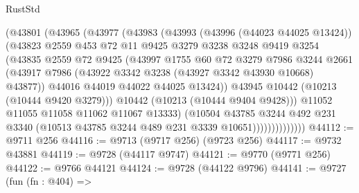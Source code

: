 \begin{lexlean}{RustStd}
\begin{coremodule}
                      (@43801
                        (@43965
                          (@43977
                            (@43983
                              (@43993
                                (@43996 (@44023 @44025 @13424))
                                (@43823
                                  @2559
                                  @453
                                  @72
                                  @11
                                  @9425
                                  @3279
                                  @3238
                                  @3248
                                  @9419
                                  @3254
                                  (@43835
                                    @2559
                                    @72
                                    @9425
                                    (@43997
                                      @1755
                                      @60
                                      @72
                                      @3279
                                      @7986
                                      @3244
                                      @2661
                                      (@43917
                                        @7986
                                        (@43922 @3342 @3238 (@43927 @3342 @43930 @10668) @43877))
                                      @44016
                                      @44019
                                      @44022
                                      @44025
                                      @13424))
                                  @43945
                                  @10442
                                  (@10213 (@10444 @9420 @3279)))
                                @10442
                                (@10213 (@10444 @9404 @9428)))
                              @11052
                              @11055
                              @11058
                              @11062
                              @11067
                              @13333)
                            (@10504
                              @43785
                              @3244
                              @492
                              @231
                              @3340
                              (@10513 @43785 @3244 @489 @231 @3339 @10651))))))))))))))
@44112 := @9711 @256
@44116 := @9713 (@9717 @256) (@9723 @256)
@44117 := @9732 @43881
@44119 := @9728 (@44117 @9747)
@44121 := @9770 (@9771 @256)
@44122 := @9766 @44121
@44124 := @9728 (@44122 @9796)
@44141 := @9727
    (fun (fn : @404) =>

\end{coremodule}
\end{lexlean}
